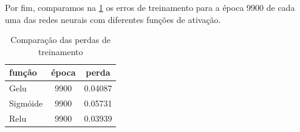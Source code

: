 Por fim, comparamos na \cref{tarefa01:tab:funcoes} os erros de treinamento para a época 9900 de cada uma das redes neurais com diferentes funções de ativação.

\begin{table}[htb]
	\centering
	\caption{Comparação das perdas de treinamento}
	\label{tarefa01:tab:funcoes}
	\begin{tabular}{ l | c | c }
		função & época & perda \\
		\hline
		Gelu & 9900 &  0.04087 \\
		Sigmóide & 9900 & 0.05731 \\
		Relu & 9900 & 0.03939 \\
	\end{tabular}
\end{table}
